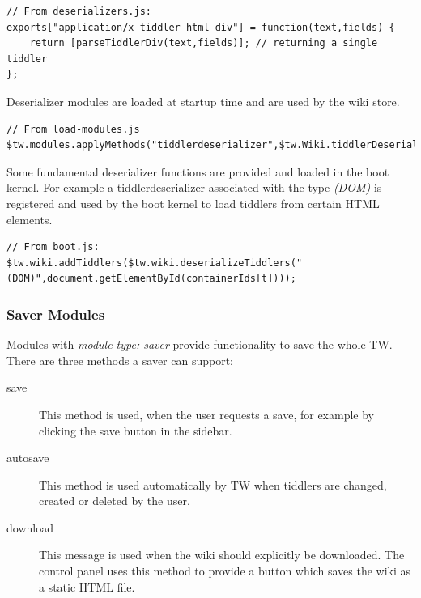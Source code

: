 \documentclass[12pt,a4paper]{scrartcl}
\begin{document}
\begin{lstlisting}[caption={Definition of a deserializer function},label=lst:deserializer-function]
// From deserializers.js:
exports["application/x-tiddler-html-div"] = function(text,fields) {
	return [parseTiddlerDiv(text,fields)]; // returning a single tiddler
};
\end{lstlisting}

Deserializer modules are loaded at startup time and are used by the wiki store.

\begin{lstlisting}[caption={Startup module registering deserializer to the tiddler store},label=lst:deserializer-register]
// From load-modules.js
$tw.modules.applyMethods("tiddlerdeserializer",$tw.Wiki.tiddlerDeserializerModules);
\end{lstlisting}

Some fundamental deserializer functions are provided and loaded in the boot kernel. For example a tiddlerdeserializer associated with the type \textit{(DOM)} is registered and used by the boot kernel to load tiddlers from certain HTML elements.

\begin{lstlisting}[caption={Boot kernel using deserializer to create tiddlers from corrent dom tree},label=lst:deserializer-dom]
// From boot.js:
$tw.wiki.addTiddlers($tw.wiki.deserializeTiddlers("(DOM)",document.getElementById(containerIds[t])));
\end{lstlisting}

\subsubsection*{Saver Modules}
Modules with \textit{module-type: saver} provide functionality to save the whole TW. There are three methods a saver can support:

\begin{description}
\item[save] This method is used, when the user requests a save, for example by clicking the save button in the sidebar.
\item[autosave] This method is used automatically by TW when tiddlers are changed, created or deleted by the user.
\item[download] This message is used when the wiki should explicitly be downloaded. The control panel uses this method to provide a button which saves the wiki as a static HTML file.
\end{description}
\end{document}
